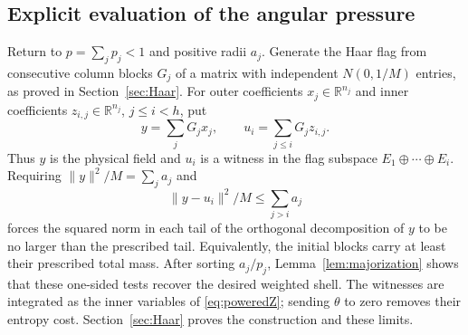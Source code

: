\documentclass[11pt]{article}
\numberwithin{equation}{section}
\theoremstyle{definition}
\newcommand{\R}{\mathbb R}
\newcommand{\norm}[1]{\lVert #1\rVert}
\begin{document}
\subsection{Explicit evaluation of the angular pressure}
\label{subsec:angularevaluation}
Return to $p=\sum_jp_j<1$ and positive radii $a_j$. Generate the Haar flag from consecutive column blocks $G_j$ of a matrix with independent $N(0,1/M)$ entries, as proved in Section~\ref{sec:Haar}. For outer coefficients $x_j\in\R^{n_j}$ and inner coefficients $z_{i,j}\in\R^{n_j}$, $j\le i<h$, put
\[
y=\sum_jG_jx_j,\qquad u_i=\sum_{j\le i}G_jz_{i,j}.
\]
Thus $y$ is the physical field and $u_i$ is a witness in the flag subspace $E_1\oplus\cdots\oplus E_i$. Requiring $\norm y^2/M=\sum_ja_j$ and
\[
\norm{y-u_i}^2/M\le\sum_{j>i}a_j
\]
forces the squared norm in each tail of the orthogonal decomposition of $y$ to be no larger than the prescribed tail. Equivalently, the initial blocks carry at least their prescribed total mass. After sorting $a_j/p_j$, Lemma~\ref{lem:majorization} shows that these one-sided tests recover the desired weighted shell. The witnesses are integrated as the inner variables of \eqref{eq:poweredZ}; sending $\theta$ to zero removes their entropy cost. Section~\ref{sec:Haar} proves the construction and these limits.
\end{document}

